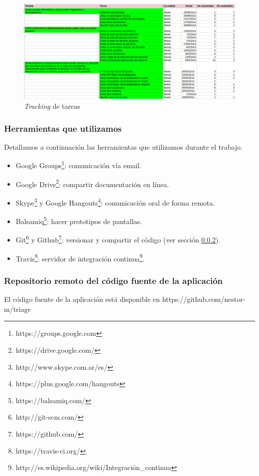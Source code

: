\begin{figure}[h]
  \centerline{\includegraphics[width=1.2\textwidth]{tracking.png}}
  \caption{\textit{Tracking} de tareas}
  \label{fig:tracking}
\end{figure}

\subsubsection{Herramientas que utilizamos}
Detallamos a continuación las herramientas que utilizamos durante el trabajo.
\begin{itemize}
\item Google Groups\footnote{https://groups.google.com}: comunicación vía email.
\item Google Drive\footnote{https://drive.google.com/}: compartir documentación en línea.
\item Skype\footnote{http://www.skype.com.ar/es/} y Google Hangouts\footnote{https://plus.google.com/hangouts}: comunicación oral de forma remota.
\item Balsamiq\footnote{https://balsamiq.com/}: hacer prototipos de pantallas.
\item Git\footnote{http://git-scm.com/} y Github\footnote{https://github.com/}: versionar y compartir el código (ver sección \ref{cap:repo}).
\item Travis\footnote{https://travis-ci.org/}: servidor de integración continua\footnote{http://es.wikipedia.org/wiki/Integración\_continua}.
\end{itemize}

\subsubsection{Repositorio remoto del código fuente de la aplicación}\label{cap:repo}
El código fuente de la aplicación está disponible en https://github.com/nestor-m/triage

